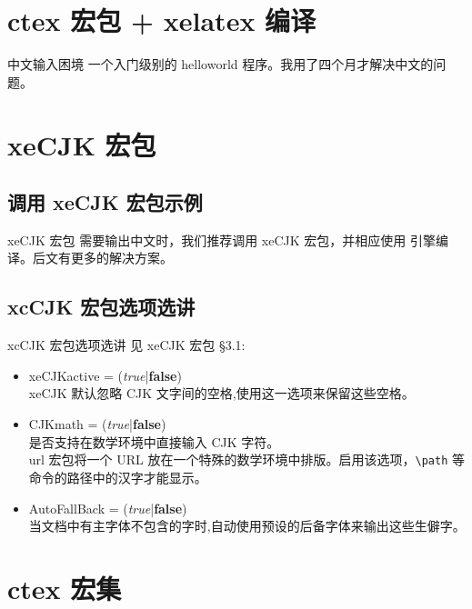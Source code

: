 \documentclass[final,aspectratio=169]{ctexbeamer}
\begin{document}
\section{ctex 宏包 + xelatex 编译}
\begin{frame}[fragile]{中文输入困境}
一个入门级别的 helloworld 程序。我用了四个月才解决中文的问题。
\end{frame}


\section{xeCJK 宏包}
\subsection[示例]{调用 xeCJK 宏包示例}
\begin{frame}[fragile]{xeCJK 宏包}
需要输出中文时，我们推荐调用 xeCJK 宏包，并相应使用  引擎编译。后文有更多的解决方案。
\end{frame}

\subsection[宏包选项]{xcCJK 宏包选项选讲}
\begin{frame}[fragile]{xcCJK 宏包选项选讲}
见 xeCJK 宏包 \cite{xecjk} \S 3.1:
\begin{itemize}
  \item xeCJKactive = (\textit{true}|\textbf{false}) \\
  xeCJK 默认忽略 CJK 文字间的空格,使用这一选项来保留这些空格。
  \item CJKmath = (\textit{true}|\textbf{false}) \\
  是否支持在数学环境中直接输入 CJK 字符。 \\
  url 宏包将一个 URL 放在一个特殊的数学环境中排版。启用该选项，\verb|\path| 等命令的路径中的汉字才能显示。
  \item AutoFallBack = (\textit{true}|\textbf{false}) \\
  当文档中有主字体不包含的字时,自动使用预设的后备字体来输出这些生僻字。
\end{itemize}
\end{frame}


\section{ctex 宏集}
\end{document}
